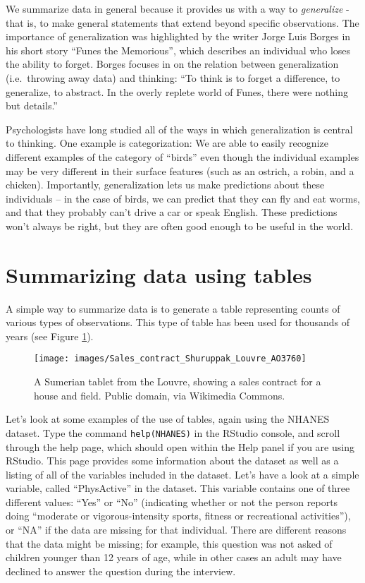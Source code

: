 \documentclass[]{book}
\theoremstyle{definition}
\theoremstyle{definition}
\theoremstyle{definition}
\theoremstyle{remark}
\begin{document}
We summarize data in general because it provides us with a way to
\emph{generalize} - that is, to make general statements that extend
beyond specific observations. The importance of generalization was
highlighted by the writer Jorge Luis Borges in his short story ``Funes
the Memorious'', which describes an individual who loses the ability to
forget. Borges focuses in on the relation between generalization
(i.e.~throwing away data) and thinking: ``To think is to forget a
difference, to generalize, to abstract. In the overly replete world of
Funes, there were nothing but details.''

Psychologists have long studied all of the ways in which generalization
is central to thinking. One example is categorization: We are able to
easily recognize different examples of the category of ``birds'' even
though the individual examples may be very different in their surface
features (such as an ostrich, a robin, and a chicken). Importantly,
generalization lets us make predictions about these individuals -- in
the case of birds, we can predict that they can fly and eat worms, and
that they probably can't drive a car or speak English. These predictions
won't always be right, but they are often good enough to be useful in
the world.

\section{Summarizing data using
tables}\label{summarizing-data-using-tables}

A simple way to summarize data is to generate a table representing
counts of various types of observations. This type of table has been
used for thousands of years (see Figure \ref{fig:salesContract}).

\begin{figure}
\texttt{[image: images/Sales\_contract\_Shuruppak\_Louvre\_AO3760]} \caption{A Sumerian tablet from the Louvre, showing a sales contract for a house and field.  Public domain, via Wikimedia Commons.}\label{fig:salesContract}
\end{figure}

Let's look at some examples of the use of tables, again using the NHANES
dataset. Type the command \texttt{help(NHANES)} in the RStudio console,
and scroll through the help page, which should open within the Help
panel if you are using RStudio. This page provides some information
about the dataset as well as a listing of all of the variables included
in the dataset. Let's have a look at a simple variable, called
``PhysActive'' in the dataset. This variable contains one of three
different values: ``Yes'' or ``No'' (indicating whether or not the
person reports doing ``moderate or vigorous-intensity sports, fitness or
recreational activities''), or ``NA'' if the data are missing for that
individual. There are different reasons that the data might be missing;
for example, this question was not asked of children younger than 12
years of age, while in other cases an adult may have declined to answer
the question during the interview.
\end{document}
